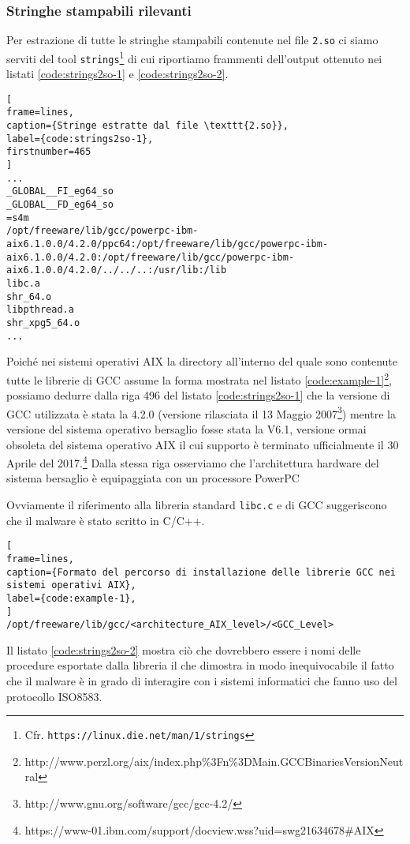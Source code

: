 \documentclass[10pt,a4paper, titlepage]{report}
\begin{document}
\subsubsection{Stringhe stampabili rilevanti}

Per estrazione di tutte le stringhe stampabili contenute nel file \texttt{2.so} ci siamo serviti del tool \texttt{strings}\footnote{Cfr. \texttt{https://linux.die.net/man/1/strings}} di cui  riportiamo frammenti dell'output ottenuto nei listati \ref{code:strings2so-1} e \ref{code:strings2so-2}.

\begin{lstlisting}[
frame=lines, 
caption={Stringe estratte dal file \texttt{2.so}}, 
label={code:strings2so-1},
firstnumber=465
]
...
_GLOBAL__FI_eg64_so
_GLOBAL__FD_eg64_so
=s4m
/opt/freeware/lib/gcc/powerpc-ibm-aix6.1.0.0/4.2.0/ppc64:/opt/freeware/lib/gcc/powerpc-ibm-aix6.1.0.0/4.2.0:/opt/freeware/lib/gcc/powerpc-ibm-aix6.1.0.0/4.2.0/../../..:/usr/lib:/lib
libc.a
shr_64.o
libpthread.a
shr_xpg5_64.o
...
\end{lstlisting}

Poiché nei sistemi operativi AIX la directory all'interno del quale sono contenute tutte le librerie di GCC assume la forma mostrata nel listato \ref{code:example-1}\footnote{http://www.perzl.org/aix/index.php\%3Fn\%3DMain.GCCBinariesVersionNeutral}, possiamo dedurre dalla riga 496 del listato \ref{code:strings2so-1} che la versione di GCC utilizzata è stata la 4.2.0 (versione rilasciata il 13 Maggio 2007\footnote{http://www.gnu.org/software/gcc/gcc-4.2/}) mentre la versione del sistema operativo bersaglio fosse stata la V6.1, versione ormai obsoleta del sistema operativo AIX il cui supporto è terminato ufficialmente il 30 Aprile del 2017.\footnote{https://www-01.ibm.com/support/docview.wss?uid=swg21634678\#AIX}
Dalla stessa riga osserviamo che l'architettura hardware del sistema bersaglio è equipaggiata con un processore PowerPC

Ovviamente il riferimento alla libreria standard \texttt{libc.c} e di GCC suggeriscono che il malware è stato scritto in C/C++.

\begin{lstlisting}[
frame=lines, 
caption={Formato del percorso di installazione delle librerie GCC nei sistemi operativi AIX}, 
label={code:example-1},
]
/opt/freeware/lib/gcc/<architecture_AIX_level>/<GCC_Level>
\end{lstlisting}

Il listato \ref{code:strings2so-2} mostra ciò che dovrebbero essere i nomi delle procedure esportate dalla libreria il che dimostra in modo inequivocabile il fatto che il malware è in grado di interagire con i sistemi informatici che fanno uso del protocollo ISO8583.
\end{document}
